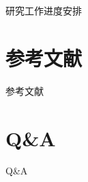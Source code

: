 \documentclass[mathserif,compress,CJKutf8, red]{beamer}
\newcommand{\chuhao}{\fontsize{42pt}{\baselineskip}\selectfont}     %
\begin{document}
\begin{CJK*}{UTF8}{song}
\begin{frame}{研究工作进度安排}
\end{frame}

\section{参考文献}

\begin{frame}[allowframebreaks]{参考文献}
\tiny


\end{frame}

\section*{Q\&A}

\begin{frame}{Q\&A}
\begin{block}{}
\centerline{\chuhao{Q\&A}}
\end{block}
\end{frame}
\end{CJK*}
\end{document}
